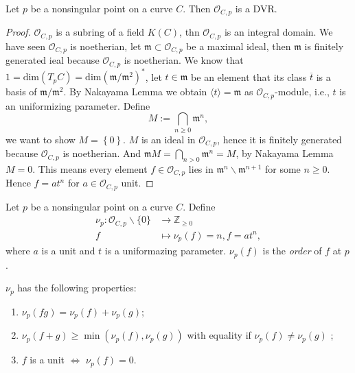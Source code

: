 \begin{theorem}
  Let $p$ be a nonsingular point on a curve $C$. Then $\mathcal{O}_{C,p}$ is a DVR.
\end{theorem}
\begin{proof}
  $\mathcal{O}_{C,p}$ is a subring of a field $K(C)$, thn $\mathcal{O}_{C,p}$ is an integral domain. We have seen $\mathcal{O}_{C,p}$ is noetherian, let $\mathfrak{m}\subset \mathcal{O}_{C,p}$ be a maximal ideal, then $\mathfrak{m}$ is finitely generated ieal because $\mathcal{O}_{C,p}$ is noetherian. We know that $1=\mathrm{dim}(T_pC)=\mathrm{dim}\left( \mathfrak{m} / \mathfrak{m}^2 \right)^{*} $, let $t\in \mathfrak{m}$ be an element that its class $\overline{t}$ is a basis of $\mathfrak{m} /\mathfrak{m}^2$. By Nakayama Lemma we obtain $\langle t\rangle=\mathfrak{m}$ as $\mathcal{O}_{C,p}$-module, i.e., $t$ is an uniformizing parameter. Define
  \[
  M:=\bigcap_{n\ge 0} \mathfrak{m}^{n},
  \] 
  we want to show $M=\left\{0\right\} $.  $M$ is an ideal in $\mathcal{O}_{C,p}$, hence it is finitely generated because $\mathcal{O}_{C,p}$ is noetherian. And $\mathfrak{m}M=\bigcap_{n>0} \mathfrak{m}^{n}=M$, by Nakayama Lemma $M=0$. This means every element $f\in \mathcal{O}_{C,p}$ lies in $\mathfrak{m}^{n}\backslash \mathfrak{m}^{n+1}$ for some $n\ge 0$. Hence $f=a t ^{n}$ for $a\in \mathcal{O}_{C,p}$ unit.
\end{proof}

\begin{definition}
  Let $p $ be a nonsingular point on a curve $C$. Define 
  \begin{align*}
    \nu_p: \mathcal{O}_{C,p} \backslash \{0\} &\longrightarrow \mathbb{Z}_{\ge 0}  \\
    f &\longmapsto \nu_p(f) =n ,f=at^n
  ,\end{align*}
  where $a$ is a unit and $t$ is a uniformazing parameter.
  $\nu_p(f)$ is the \textit{order} of $f$ at $p$. 
\end{definition}
\begin{remark}
  $\nu_p$ has the following properties:
  \begin{enumerate}
    \item $\nu_p(fg)=\nu_p(f)+\nu_p(g)$;
    \item  $\nu_p(f+g)\ge \min \left( \nu_p(f),\nu_p(g) \right) $ with equality if $\nu_p(f)\neq \nu_p(g)$ ;
    \item $f$ is a unit $\Leftrightarrow$ $\nu_p(f)=0$.
  \end{enumerate}
\end{remark}

